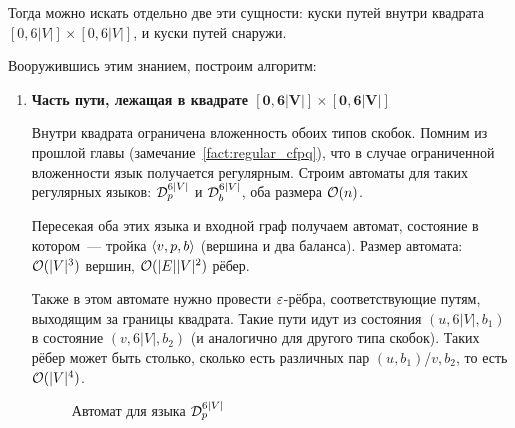Тогда можно искать отдельно две эти сущности: куски путей внутри квадрата $[0, 6|V|] \times [0, 6|V|]$, и куски путей снаружи.

Вооружившись этим знанием, построим алгоритм:

\begin{enumerate}
    \item {\bf Часть пути, лежащая в квадрате $\mathbf{[0, 6|V|] \times [0, 6|V|]}$}

    Внутри квадрата ограничена вложенность обоих типов скобок. Помним из прошлой главы (замечание~\ref{fact:regular_cfpq}), что в случае ограниченной вложенности язык получается регулярным. Строим автоматы для таких регулярных языков: $\mathcal{D}_p^{6|V|}$ и $\mathcal{D}_b^{6|V|}$, оба размера $\mathcal{O}(n)$.

    Пересекая оба этих языка и входной граф получаем автомат, состояние в котором~--- тройка $\langle v, p, b \rangle$ (вершина и два баланса). Размер автомата: $\mathcal{O}(|V|^3)$ вершин, $\mathcal{O}(|E||V|^2)$ рёбер.

    Также в этом автомате нужно провести $\varepsilon$-рёбра, соответствующие путям, выходящим за границы квадрата. Такие пути идут из состояния $(u, 6|V|, b_1)$ в состояние $(v, 6|V|, b_2)$ (и аналогично для другого типа скобок). Таких рёбер может быть столько, сколько есть различных пар $(u, b_1)$/$v, b_2$, то есть $\mathcal{O}(|V|^4)$.

    \begin{figure}[h]
      \caption{Автомат для языка $\mathcal{D}_p^{6|V|}$}
      \label{img:dyck_6n_dfa}
    \end{figure}


\end{enumerate}
